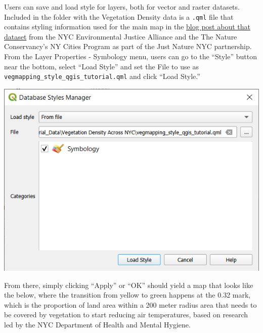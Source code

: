 \documentclass[
  letterpaper,
  DIV=11,
  numbers=noendperiod]{scrreprt}
\begin{document}
Users can save and load style for layers, both for vector and raster
datasets. Included in the folder with the Vegetation Density data is a
\texttt{.qml} file that contains styling information used for the main
map in the
\href{https://medium.com/gage-nyc/looking-at-cooling-benefits-of-plants-through-nyc-vegetation-data-ccdeb33cbe17}{blog
post about that dataset} from the NYC Environmental Justice Alliance and
the The Nature Conservancy's NY Cities Program as part of the Just
Nature NYC partnership. From the Layer Properties - Symbology menu,
users can go to the ``Style'' button near the bottom, select ``Load
Style'' and set the File to use as
\texttt{vegmapping\_style\_qgis\_tutorial.qml} and click ``Load Style.''

\includegraphics{./images/style_manager.png}

From there, simply clicking ``Apply'' or ``OK'' should yield a map that
looks like the below, where the transition from yellow to green happens
at the 0.32 mark, which is the proportion of land area within a 200
meter radius area that needs to be covered by vegetation to start
reducing air temperatures, based on research led by the NYC Department
of Health and Mental Hygiene.
\end{document}
